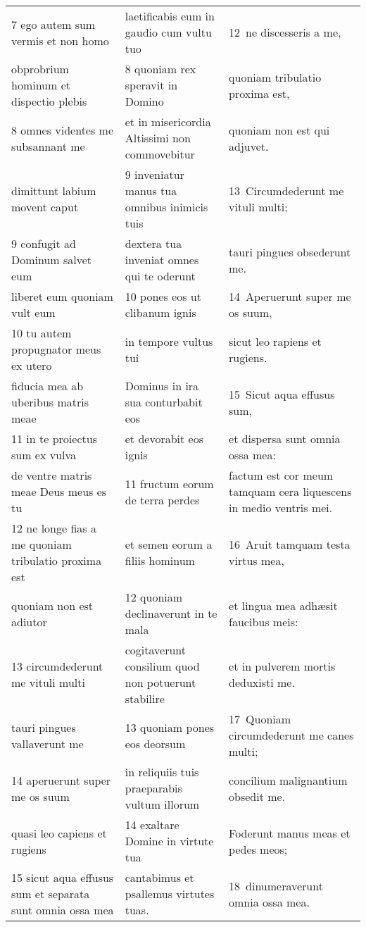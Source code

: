 \documentclass{article}
\begin{document}
\begin{longtable}{@{}p{}p{}p{}@{}}
7 ego autem sum vermis et non homo	&	laetificabis eum in gaudio cum vultu tuo	&	12 ne discesseris a me,	\\
obprobrium hominum et dispectio plebis	&	8 quoniam rex speravit in Domino	&	quoniam tribulatio proxima est,	\\
8 omnes videntes me subsannant me	&	et in misericordia Altissimi non commovebitur	&	quoniam non est qui adjuvet.	\\
dimittunt labium movent caput	&	9 inveniatur manus tua omnibus inimicis tuis	&	13 Circumdederunt me vituli multi;	\\
9 confugit ad Dominum salvet eum	&	dextera tua inveniat omnes qui te oderunt	&	tauri pingues obsederunt me.	\\
liberet eum quoniam vult eum	&	10 pones eos ut clibanum ignis	&	14 Aperuerunt super me os suum,	\\
10 tu autem propugnator meus ex utero	&	in tempore vultus tui	&	sicut leo rapiens et rugiens.	\\
fiducia mea ab uberibus matris meae	&	Dominus in ira sua conturbabit eos	&	15 Sicut aqua effusus sum,	\\
11 in te proiectus sum ex vulva	&	et devorabit eos ignis	&	et dispersa sunt omnia ossa mea:	\\
de ventre matris meae Deus meus es tu	&	11 fructum eorum de terra perdes	&	factum est cor meum tamquam cera liquescens in medio ventris mei.	\\
12 ne longe fias a me quoniam tribulatio proxima est	&	et semen eorum a filiis hominum	&	16 Aruit tamquam testa virtus mea,	\\
quoniam non est adiutor	&	12 quoniam declinaverunt in te mala	&	et lingua mea adhæsit faucibus meis:	\\
13 circumdederunt me vituli multi	&	cogitaverunt consilium quod non potuerunt stabilire	&	et in pulverem mortis deduxisti me.	\\
tauri pingues vallaverunt me	&	13 quoniam pones eos deorsum	&	17 Quoniam circumdederunt me canes multi;	\\
14 aperuerunt super me os suum	&	in reliquiis tuis praeparabis vultum illorum	&	concilium malignantium obsedit me.	\\
quasi leo capiens et rugiens	&	14 exaltare Domine in virtute tua	&	Foderunt manus meas et pedes meos;	\\
15 sicut aqua effusus sum et separata sunt omnia ossa mea	&	cantabimus et psallemus virtutes tuas.	&	18 dinumeraverunt omnia ossa mea.	\\

\end{longtable}
\end{document}
